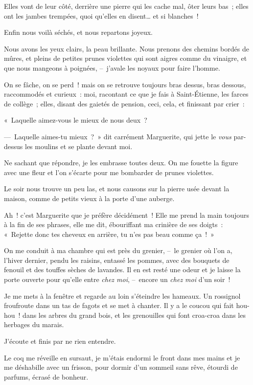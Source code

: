 \documentclass[french,twoside]{book} %
\begin{document}
Elles vont de leur côté, derrière une pierre qui les cache mal, ôter leurs bas ; elles ont les jambes trempées, quoi qu’elles en disent… et si blanches !\par
Enfin nous voilà séchés, et nous repartons joyeux.\par
Nous avons les yeux clairs, la peau brillante. Nous prenons des chemins bordés de mûres, et pleins de petites prunes violettes qui sont aigres comme du vinaigre, et que nous mangeons à poignées, – j’avale les noyaux pour faire l’homme.\par
On se fâche, on se perd ! mais on se retrouve toujours bras dessus, bras dessous, raccommodés et curieux : moi, racontant ce que je fais à Saint-Étienne, les farces de collège ; elles, disant des gaietés de pension, ceci, cela, et finissant par crier :\par
« Laquelle aimez-vous le mieux de nous deux ?\par
— Laquelle aimes-tu mieux ? » dit carrément Marguerite, qui jette le\emph{ vous} par-dessus les moulins et se plante devant moi.\par
Ne sachant que répondre, je les embrasse toutes deux. On me fouette la figure avec une fleur et l’on s’écarte pour me bombarder de prunes violettes.\par
\bigbreak
\noindent Le soir nous trouve un peu las, et nous causons sur la pierre usée devant la maison, comme de petits vieux à la porte d’une auberge.\par
Ah ! c’est Marguerite que je préfère décidément ! Elle me prend la main toujours à la fin de ses phrases, elle me dit, ébouriffant ma crinière de ses doigts : « Rejette donc tes cheveux en arrière, tu n’es pas beau comme ça ! »\par
On me conduit à ma chambre qui est près du grenier, – le grenier où l’on a, l’hiver dernier, pendu les raisins, entassé les pommes, avec des bouquets de fenouil et des touffes sèches de lavandes. Il en est resté une odeur et je laisse la porte ouverte pour qu’elle entre \emph{chez moi}, – encore un \emph{chez moi} d’un soir !\par
Je me mets à la fenêtre et regarde au loin s’éteindre les hameaux. Un rossignol froufroute dans un tas de fagots et se met à chanter. Il y a le coucou qui fait hou-hou ! dans les arbres du grand bois, et les grenouilles qui font croa-croa dans les herbages du marais.\par
J’écoute et finis par ne rien entendre.\par
Le coq me réveille en sursaut, je m’étais endormi le front dans mes mains et je me déshabille avec un frisson, pour dormir d’un sommeil sans rêve, étourdi de parfums, écrasé de bonheur.\par
\end{document}
